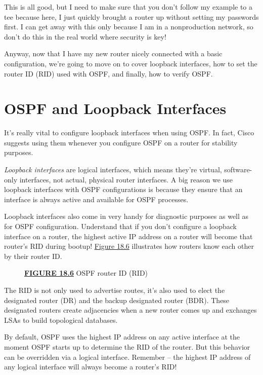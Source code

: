 This is all good, but I need to make sure that you don't follow my
example to a tee because here, I just quickly brought a router up
without setting my passwords first. I can
\protect\hypertarget{c18.xhtmlux5cux23Page_762}{}{}get away with this
only because I am in a nonproduction network, so don't do this in the
real world where security is key!

Anyway, now that I have my new router nicely connected with a basic
configuration, we're going to move on to cover loopback interfaces, how
to set the router ID (RID) used with OSPF, and finally, how to verify
OSPF.



\section{OSPF and Loopback Interfaces}

It's really vital to configure loopback interfaces when using OSPF. In
fact, Cisco suggests using them whenever you configure OSPF on a router
for stability purposes.

\emph{Loopback interfaces} are logical interfaces, which means they're
virtual, software-only interfaces, not actual, physical router
interfaces. A big reason we use loopback interfaces with OSPF
configurations is because they ensure that an interface is always active
and available for OSPF processes.

Loopback interfaces also come in very handy for diagnostic purposes as
well as for OSPF configuration. Understand that if you don't configure a
loopback interface on a router, the highest active IP address on a
router will become that router's RID during bootup!
\protect\hyperlink{c18.xhtmlux5cux23figure18-6}{Figure 18.6} illustrates
how routers know each other by their router ID.

\begin{figure}
\centering
\caption{{\protect\hyperlink{c18.xhtmlux5cux23figureanchor18-6}{\textbf{FIGURE
18.6}} OSPF router ID (RID)}}
\end{figure}

The RID is not only used to advertise routes, it's also used to elect
the designated router (DR) and the backup designated router (BDR). These
designated routers create adjacencies when a new router comes up and
exchanges LSAs to build topological databases.

\begin{note}
By default, OSPF uses the highest IP address on any active interface at the moment OSPF starts up to determine the RID of the router.
But this behavior can be overridden via a logical interface.
Remember -- the highest IP address of any logical interface will always become a router's RID!
\end{note}


